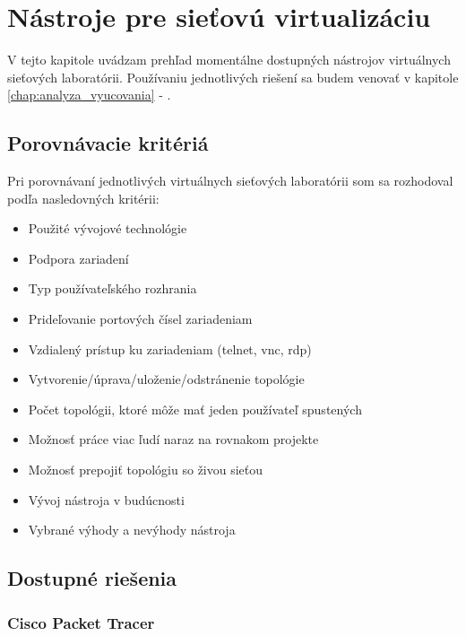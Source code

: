\chapter{Nástroje pre sieťovú virtualizáciu}
\label{chap:nastroje_pre_siet_virt}

V tejto kapitole uvádzam prehľad momentálne dostupných nástrojov virtuálnych sieťových laboratórii. Používaniu jednotlivých riešení sa budem venovať v kapitole \ref{chap:analyza_vyucovania} - .
  
\section{Porovnávacie kritériá}

Pri porovnávaní jednotlivých virtuálnych sieťových laboratórii som sa rozhodoval podľa nasledovných kritérii:
\begin{itemize}[noitemsep]
    \item Použité vývojové technológie
    \item Podpora zariadení
    \item Typ používateľského rozhrania
    \item Prideľovanie portových čísel zariadeniam
    \item Vzdialený prístup ku zariadeniam (telnet, vnc, rdp)
    \item Vytvorenie/úprava/uloženie/odstránenie topológie
    \item Počet topológii, ktoré môže mať jeden používateľ spustených
    \item Možnosť práce viac ľudí naraz na rovnakom projekte
    \item Možnosť prepojiť topológiu so živou sieťou
    \item Vývoj nástroja v budúcnosti
    \item Vybrané výhody a nevýhody nástroja
\end{itemize}


\section{Dostupné riešenia}

\subsection{Cisco Packet Tracer}

